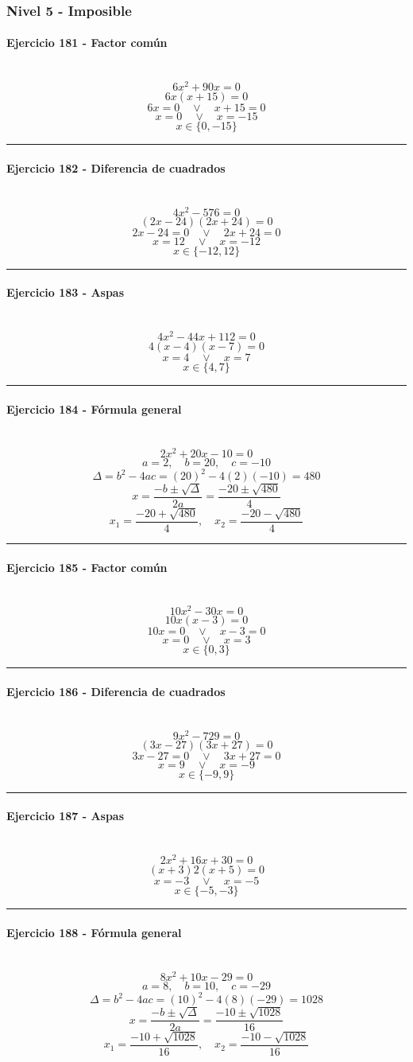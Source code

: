\documentclass[10pt,a4paper]{article}
\newcommand{\res}[1]{\paragraph{#1}\mbox{}\\[-1.2em]}
\begin{document}
\subsubsection*{Nivel 5 - Imposible}
\res{Ejercicio 181 - Factor común}
\[ 6 x^{2} + 90 x=0 \]
\[ 6x(x+15)=0 \]
\[ 6x=0 \quad \vee \quad x+15=0 \]
\[ x=0 \quad \vee \quad x=-15 \]
\[ \boxed{x\in\{0,-15\}} \]
\vspace{1mm}\hrule\vspace{2mm}
\res{Ejercicio 182 - Diferencia de cuadrados}
\[ 4 x^{2} - 576=0 \]
\[ (2x-24)(2x+24)=0 \]
\[ 2x-24=0 \quad \vee \quad 2x+24=0 \]
\[ x=12 \quad \vee \quad x=-12 \]
\[ \boxed{x\in\{-12,12\}} \]
\vspace{1mm}\hrule\vspace{2mm}
\res{Ejercicio 183 - Aspas}
\[ 4 x^{2} - 44 x + 112=0 \]
\[ 4(x-4)(x-7)=0 \]
\[ x=4 \quad \vee \quad x=7 \]
\[ \boxed{x\in\{4,7\}} \]
\vspace{1mm}\hrule\vspace{2mm}
\res{Ejercicio 184 - Fórmula general}
\[ 2 x^{2} + 20 x - 10=0 \]
\[ a=2,\quad b=20,\quad c=-10 \]
\[ \Delta=b^2-4ac=(20)^2-4(2)(-10)=480 \]
\[ x=\frac{-b\pm\sqrt{\Delta}}{2a}=\frac{-20\pm\sqrt{480}}{4} \]
\[ \boxed{x_1=\frac{-20+\sqrt{480}}{4},\quad x_2=\frac{-20-\sqrt{480}}{4}} \]
\vspace{1mm}\hrule\vspace{2mm}
\res{Ejercicio 185 - Factor común}
\[ 10 x^{2} - 30 x=0 \]
\[ 10x(x-3)=0 \]
\[ 10x=0 \quad \vee \quad x-3=0 \]
\[ x=0 \quad \vee \quad x=3 \]
\[ \boxed{x\in\{0,3\}} \]
\vspace{1mm}\hrule\vspace{2mm}
\res{Ejercicio 186 - Diferencia de cuadrados}
\[ 9 x^{2} - 729=0 \]
\[ (3x-27)(3x+27)=0 \]
\[ 3x-27=0 \quad \vee \quad 3x+27=0 \]
\[ x=9 \quad \vee \quad x=-9 \]
\[ \boxed{x\in\{-9,9\}} \]
\vspace{1mm}\hrule\vspace{2mm}
\res{Ejercicio 187 - Aspas}
\[ 2 x^{2} + 16 x + 30=0 \]
\[ (x+3)2(x+5)=0 \]
\[ x=-3 \quad \vee \quad x=-5 \]
\[ \boxed{x\in\{-5,-3\}} \]
\vspace{1mm}\hrule\vspace{2mm}
\res{Ejercicio 188 - Fórmula general}
\[ 8 x^{2} + 10 x - 29=0 \]
\[ a=8,\quad b=10,\quad c=-29 \]
\[ \Delta=b^2-4ac=(10)^2-4(8)(-29)=1028 \]
\[ x=\frac{-b\pm\sqrt{\Delta}}{2a}=\frac{-10\pm\sqrt{1028}}{16} \]
\[ \boxed{x_1=\frac{-10+\sqrt{1028}}{16},\quad x_2=\frac{-10-\sqrt{1028}}{16}} \]
\end{document}
